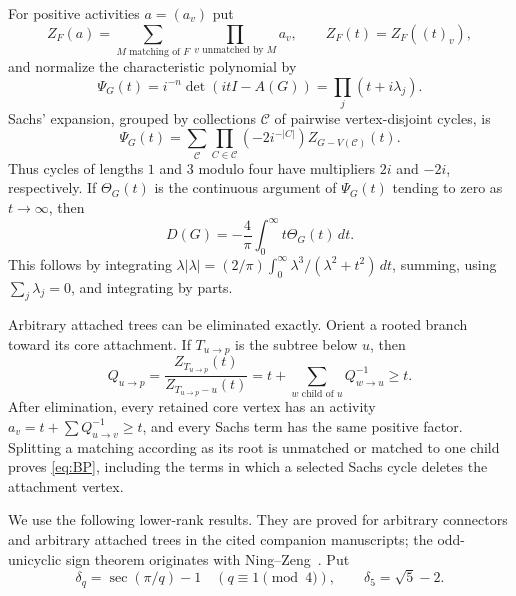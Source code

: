 \documentclass[11pt]{article}
\theoremstyle{remark}
\begin{document}
For positive activities $a=(a_v)$ put
\[
 Z_F(a)=\sum_{M\text{ matching of }F}\prod_{v\text{ unmatched by }M}a_v,
 \qquad Z_F(t)=Z_F((t)_v),
\]
and normalize the characteristic polynomial by
\[
 \Psi_G(t)=i^{-n}\det(itI-A(G))=\prod_j(t+i\lambda_j).
\]
Sachs' expansion, grouped by collections $\mathcal C$ of pairwise
vertex-disjoint cycles, is
\begin{equation}\label{eq:sachs}
 \Psi_G(t)=\sum_{\mathcal C}
 \prod_{C\in\mathcal C}(-2i^{-|C|})Z_{G-V(\mathcal C)}(t).
\end{equation}
Thus cycles of lengths $1$ and $3$ modulo four have multipliers $2i$ and
$-2i$, respectively.  If $\Theta_G(t)$ is the continuous argument of
$\Psi_G(t)$ tending to zero as $t\to\infty$, then
\begin{equation}\label{eq:coulson}
 D(G)=-\frac4\pi\int_0^\infty t\Theta_G(t)\,dt.
\end{equation}
This follows by integrating
$\lambda|\lambda|=(2/\pi)\int_0^\infty
\lambda^3/(\lambda^2+t^2)\,dt$, summing, using $\sum_j\lambda_j=0$, and
integrating by parts.

Arbitrary attached trees can be eliminated exactly.  Orient a rooted branch
toward its core attachment.  If $T_{u\to p}$ is the subtree below $u$, then
\begin{equation}\label{eq:BP}
 Q_{u\to p}=\frac{Z_{T_{u\to p}}(t)}{Z_{T_{u\to p}-u}(t)}
 =t+\sum_{w\text{ child of }u}Q_{w\to u}^{-1}\geq t.
\end{equation}
After elimination, every retained core vertex has an activity
$a_v=t+\sum Q_{u\to v}^{-1}\geq t$, and every Sachs term has the same positive
factor.  Splitting a matching according as its root is unmatched or matched
to one child proves \eqref{eq:BP}, including the terms in which a selected
Sachs cycle deletes the attachment vertex.

We use the following lower-rank results.  They are proved for arbitrary
connectors and arbitrary attached trees in the cited companion manuscripts;
the odd-unicyclic sign theorem originates with Ning--Zeng~\cite{NingZeng}.
Put
\[
 \delta_q=\sec(\pi/q)-1\quad(q\equiv1\pmod4),
 \qquad \delta_5=\sqrt5-2.
\]
\end{document}
